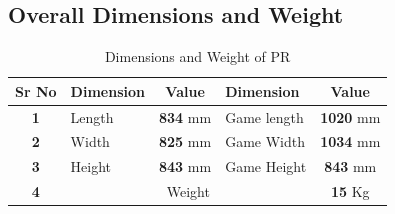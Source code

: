     \subsection{Overall Dimensions and Weight}
        \begin{table}[h]

            \begin{minipage}[t][3.2cm]{\textwidth}
                \begin{minipage}[t]{0.4\textwidth}
                    \centering
                    \caption{Dimensions and Weight of PR} \label{Dimensions_PR} \small
                    \begin{tabular}{|c|l|c|l|c|}
                        \hline
                        \textbf{Sr No}  & \textbf{Dimension} & \textbf{Value}  & \textbf{Dimension}      & \textbf{Value}   \\ \hline
                        \textbf{1}      & Length             & \textbf{834} mm & Game length             & \textbf{1020} mm \\ \hline
                        \textbf{2}      & Width              & \textbf{825} mm & Game Width              & \textbf{1034} mm \\ \hline
                        \textbf{3}      & Height             & \textbf{843} mm & Game Height             & \textbf{843} mm  \\ \hline
                        \textbf{4}      & \multicolumn{3}{c|}{Weight}                                    & \textbf{15} Kg      \\ \hline
                    \end{tabular}
                \end{minipage}                   

\end{minipage}
\end{table}
